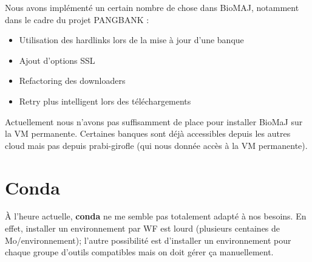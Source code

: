 Nous avons implémenté un certain nombre de chose dans BioMAJ, notamment dans le cadre du projet PANGBANK :
\begin{itemize}
    \item Utilisation des hardlinks lors de la mise à jour d'une banque
    \item Ajout d'options SSL
    \item Refactoring des downloaders
    \item Retry plus intelligent lors des téléchargements
\end{itemize}
Actuellement nous n'avons pas suffisamment de place pour installer BioMaJ sur la VM permanente.
Certaines banques sont déjà accessibles depuis les autres cloud mais pas depuis prabi-girofle (qui nous donnée accès à la VM permanente).

\section{Conda}
À l'heure actuelle, \textbf{conda} ne me semble pas totalement adapté à nos besoins.
En effet, installer un environnement par WF est lourd (plusieurs centaines de Mo/environnement); l'autre possibilité est d'installer un environnement pour chaque groupe d'outils compatibles mais on doit gérer ça manuellement.
